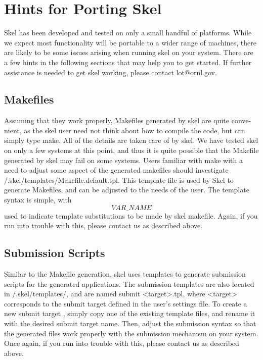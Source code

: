 
\chapter{Hints for Porting Skel}
Skel has been developed and tested on only a small handful of platforms. While
we expect most functionality will be portable to a wider range of machines,
there are likely to be some issues arising when running skel on your system.
There are a few hints in the following sections that may help you to get started.
If further assistance is needed to get skel working, please contact lot@ornl.gov.

\section{Makefiles}
Assuming that they work properly, Makefiles generated by skel are quite conve-
nient, as the skel user need not think about how to compile the code, but can
simply type make. All of the details are taken care of by skel. We have tested
skel on only a few systems at this point, and thus it is quite possible that the
Makefile generated by skel may fail on some systems. Users familiar with make
with a need to adjust some aspect of the generated makefiles should investigate
/.skel/templates/Makefile.default.tpl. This template file is used by Skel to
generate Makefiles, and can be adjusted to the needs of the user. The template
syntax is simple, with {\tt $$VAR\_NAME$$} used to indicate template substitutions
to be made by skel makefile. Again, if you run into trouble with this, please
contact us as described above.

\section{Submission Scripts}
Similar to the Makefile generation, skel uses templates to generate submission
scripts for the generated applications. The submission templates are also located
in
/.skel/templates/, and are named submit <target>.tpl, where <target>
corresponds to the submit target defined in the user's settings file. To create a
new submit target , simply copy one of the existing template files, and rename
it with the desired submit target name. Then, adjust the submission syntax
so that the generated files work properly with the submission mechanism on
your system. Once again, if you run into trouble with this, please contact us as
described above.
